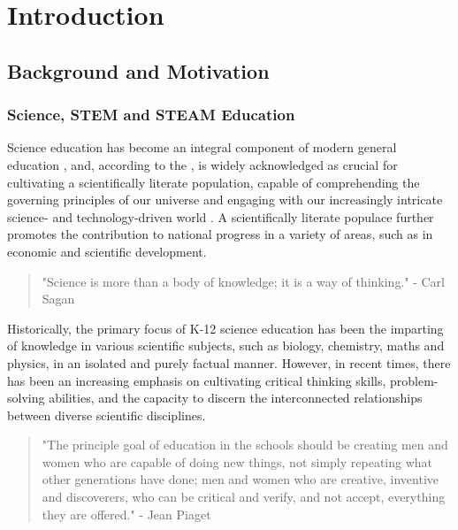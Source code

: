 \cleardoublepage%
\chapter{\label{chap:intro}Introduction}%

\section{\label{sec:intro_background_motivation}Background and Motivation}%

\subsection{\label{sec:intro_se}Science, STEM and STEAM Education}%
Science education has become an integral component of modern general education \citep{atkin_inside_2003}, and, according to the \citet{national_research_council_national_1995, national_research_foundation_science_2022}, is widely acknowledged as crucial for cultivating a scientifically literate population, capable of comprehending the governing principles of our universe and engaging with our increasingly intricate science- and technology-driven world \citep{bybee_case_2013}. A scientifically literate populace further promotes the contribution to national progress in a variety of areas, such as in economic and scientific development. \citep{atkin_inside_2003}

\begin{quote}
    "Science is more than a body of knowledge; it is a way of thinking." - Carl Sagan \citep{sagan_demon-haunted_1995} 
\end{quote}

Historically, the primary focus of K-12 science education has been the imparting of knowledge in various scientific subjects, such as biology, chemistry, maths and physics, in an isolated and purely factual manner. However, in recent times, there has been an increasing emphasis on cultivating critical thinking skills, problem-solving abilities, and the capacity to discern the interconnected relationships between diverse scientific disciplines. \citep{national_research_council_national_1995, noauthor_next_2013, atkin_inside_2003} 

\begin{quote}
    "The principle goal of education in the schools should be creating men and women who are capable of doing new things, not simply repeating what other generations have done; men and women who are creative, inventive and discoverers, who can be critical and verify, and not accept, everything they are offered." - Jean Piaget \citep{duckworth_piaget_1964}
\end{quote}

